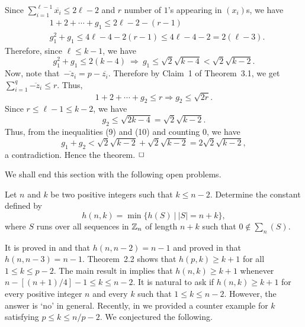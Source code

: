 \documentclass[fleqn]{mat01}
\begin{document}
\begin{pot}
{Since $\sum_{i=1}^{\ell-1}\overline{x_i}\leq 2\ell-2$ and $r$ number of
$1$'s appearing in $(x_i)$s, we have
\begin{align*}
&1+2+\cdots+g_1 \leq 2\ell -2-(r-1)\\[.3pc]
&g_1^2+g_1 \leq 4\ell -4-2(r-1)\leq 4\ell-4-2 = 2(\ell-3).
\end{align*}
Therefore, since $\ell \leq k-1$, we have
\begin{equation}
g_1^2+g_1 \leq 2(k-4) \ \Longrightarrow \ g_1 \leq \sqrt{2} \sqrt{k-4}<
\sqrt{2} \sqrt{k-2}.
\end{equation}
Now, note that\, $\overline{-z_i} = p -\overline{z_i}$. Therefore by
Claim~1 of Theorem~3.1, we get $\sum_{i=1}^q\overline{-z_i}\leq r$. Thus,
\begin{equation*}
1+2+\cdots+g_2\leq r \Longrightarrow g_2 \leq \sqrt{2r}.
\end{equation*}
Since $r\leq \ell-1\leq k-2$, we have
\begin{equation}
g_2\leq \sqrt{2k-4} = \sqrt{2}\sqrt{k-2}.
\end{equation}
Thus, from the inequalities (9) and (10) and counting $0$, we have
\begin{equation*}
g_1+g_2 < \sqrt{2}\sqrt{k-2}+\sqrt{2}\sqrt{k-2} = 2\sqrt{2}\sqrt{k-2},
\end{equation*}
a contradiction. Hence the theorem.} $\hfill\Box$
\end{pot}

We shall end this section with the following open problems.\vspace{.7pc}

\begin{openpro} Let $n$ and $k$ be two positive integers such that
$k\leq n-2$. Determine the constant defined by
\begin{equation*}
h(n,k)=\min\{h(S) \ | \  |S|=n+k\},
\end{equation*}
where $S$ runs over all sequences in ${\Bbb Z}_n$ of length $n+k$ such that
$0\not\in \sum_n(S)$.\vspace{.7pc}
\end{openpro}\pagebreak

It is proved in \cite{bd} and \cite{yp1} that $h(n,n-2)=n-1$ and proved
in \cite{fo1} that $h(n,n-3)=n-1$. Theorem~2.2 shows that $h(p, k)
\geq k+1$ for all $1 \leq k \leq p-2$. The main result in \cite{gao10}
implies that $h(n,k)\geq k+1$ whenever $n-[(n+1)/4]-1\leq k\leq n-2$. It
is natural to ask if $h(n,k)\geq k+1$ for every positive integer $n$ and
every $k$ such that $1\leq k\leq n-2$. However, the answer is `no' in
general. Recently, in \cite{gaothaw} we provided a counter example for
$k$ satisfying $p \leq k\leq n/p-2$. We conjectured the following.\vspace{.7pc}
\end{document}
